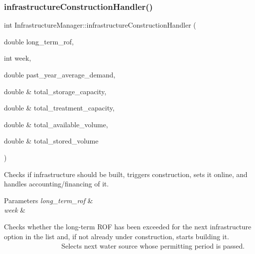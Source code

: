 \mbox{\label{classInfrastructureManager_a06c7a2df105a2a8dd3ef625ad42694ce}} 
\subsubsection{\texorpdfstring{infrastructure\+Construction\+Handler()}{infrastructureConstructionHandler()}}
{\footnotesize\ttfamily int Infrastructure\+Manager\+::infrastructure\+Construction\+Handler (\begin{DoxyParamCaption}\item[{double}]{long\+\_\+term\+\_\+rof,  }\item[{int}]{week,  }\item[{double}]{past\+\_\+year\+\_\+average\+\_\+demand,  }\item[{double \&}]{total\+\_\+storage\+\_\+capacity,  }\item[{double \&}]{total\+\_\+treatment\+\_\+capacity,  }\item[{double \&}]{total\+\_\+available\+\_\+volume,  }\item[{double \&}]{total\+\_\+stored\+\_\+volume }\end{DoxyParamCaption})}

Checks if infrastructure should be built, triggers construction, sets it online, and handles accounting/financing of it. 
\begin{DoxyParams}{Parameters}
{\em long\+\_\+term\+\_\+rof} & \\
\hline
{\em week} & \\
\hline
\end{DoxyParams}
Checks whether the long-\/term R\+OF has been exceeded for the next infrastructure option in the list and, if not already under construction, starts building it. ~\newline
~\newline
~\newline
~\newline
~\newline
~\newline
~\newline
~\newline
~\newline
~\newline
~\newline
~\newline
~\newline
~\newline
 Selects next water source whose permitting period is passed.

